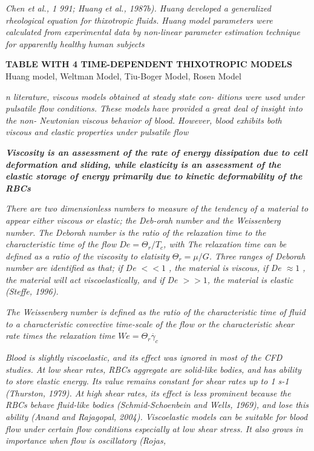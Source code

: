 \documentclass[11pt,letterpaper]{article}
\begin{document}
 \textit{Chen  et al., 1 991;  Huang  et al., 1987b). Huang developed a generalized  rheological equation for thixotropic fluids. Huang model parameters were calculated from experimental data by non-linear parameter estimation technique for  apparently healthy  human subjects}

\textbf{TABLE WITH 4 TIME-DEPENDENT THIXOTROPIC MODELS}
Huang model, Weltman Model, Tiu-Boger Model, Rosen Model 


\textit{n literature, viscous models obtained at steady state  con- ditions were used under pulsatile flow conditions. These models have  provided  a great deal  of insight  into the  non- Newtonian viscous behavior of blood. However,  blood exhibits both viscous and elastic  properties under pulsatile flow }

\textbf{
\textit{Viscosity  is  an assessment  of the rate of energy dissipation due to cell deformation and sliding, while elasticity is an assessment of  the elastic  storage of  energy  primarily due to kinetic deformability of the RBCs}}


\textit{There are  two dimensionless numbers to measure of the tendency of a material to  appear either viscous or  elastic; the  Deb-orah number and the  Weissenberg number. The Deborah number is the  ratio of the relaxation time to  the characteristic time of the flow $De= \Theta_r/ T_c$, with The relaxation time can  be defined as  a ratio of the viscosity to elatisity $\Theta_r=\mu/G$. Three ranges  of Deborah  number  are  identified as that; if
De $<<1$ ,  the material is  viscous, if De $\approx1$ ,  the material will act viscoelastically, and if De $>>1$, the material is elastic (Steffe, 1996).}


\textit{The Weissenberg number is  defined as the ratio of  the characteristic time of fluid to  a characteristic convective time-scale of the flow or the characteristic shear rate times the relaxation time $We = \Theta_r \Dot{\gamma_c}$}

\textit{Blood is slightly  viscoelastic, and  its  effect was  ignored in
most  of the CFD studies. At low shear rates, RBCs aggregate are solid-like bodies, and  has ability to store elastic energy.  Its value remains constant  for shear rates up  to 1 s-1
 (Thurston, 1979).  At  high shear rates, its  effect is less  prominent because the RBCs behave fluid-like  bodies (Schmid-Schoenbein and Wells, 1969), and  lose this ability  (Anand and Rajagopal, 2004). Viscoelastic models can be suitable  for  blood flow under certain flow conditions  especially at  low shear  stress. It also grows in importance when flow is oscillatory (Rojas,}
 
\end{document}
